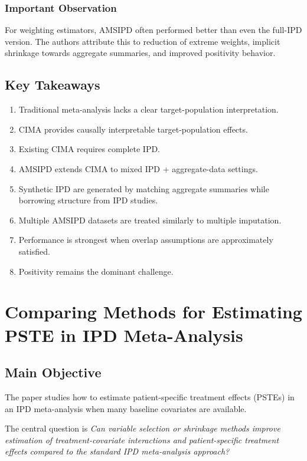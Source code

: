 \documentclass[11pt]{article}
\begin{document}
\subsubsection*{Important Observation}

For weighting estimators, AMSIPD often performed better than even the full-IPD version. The authors attribute this to reduction of extreme weights, implicit shrinkage towards aggregate summaries, and improved positivity behavior.

\subsection*{Key Takeaways}

\begin{enumerate}
    \item Traditional meta-analysis lacks a clear target-population interpretation.
    \item CIMA provides causally interpretable target-population effects.
    \item Existing CIMA requires complete IPD.
    \item AMSIPD extends CIMA to mixed IPD + aggregate-data settings.
    \item Synthetic IPD are generated by matching aggregate summaries while borrowing structure from IPD studies.
    \item Multiple AMSIPD datasets are treated similarly to multiple imputation.
    \item Performance is strongest when overlap assumptions are approximately satisfied.
    \item Positivity remains the dominant challenge.
\end{enumerate}

\section{Comparing Methods for Estimating PSTE in IPD Meta-Analysis}

\subsection*{Main Objective}

The paper studies how to estimate patient-specific treatment effects (PSTEs) in an IPD meta-analysis when many baseline covariates are available.

The central question is \emph{Can variable selection or shrinkage methods improve estimation of treatment-covariate interactions and patient-specific treatment effects compared to the standard IPD meta-analysis approach?}
\end{document}
